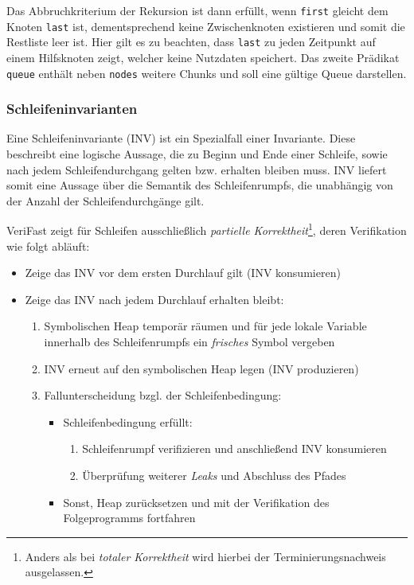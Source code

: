 Das Abbruchkriterium der Rekursion ist dann erfüllt, wenn \texttt{first} gleicht dem Knoten \texttt{last} ist, dementsprechend keine Zwischenknoten existieren und somit die Restliste leer ist. Hier gilt es zu beachten, dass \texttt{last} zu jeden Zeitpunkt auf einem Hilfsknoten zeigt, welcher keine Nutzdaten speichert. Das zweite Prädikat \texttt{queue} enthält neben \texttt{nodes} weitere Chunks und soll eine gültige Queue darstellen. %

\subsubsection{Schleifeninvarianten}

Eine Schleifeninvariante (INV) ist ein Spezialfall einer Invariante. Diese beschreibt eine logische Aussage, die zu Beginn und Ende einer Schleife, sowie nach jedem Schleifendurchgang gelten bzw. erhalten bleiben muss. INV liefert somit eine Aussage über die Semantik des Schleifenrumpfs, die unabhängig von der Anzahl der Schleifendurchgänge gilt.

VeriFast zeigt für Schleifen ausschließlich \emph{partielle Korrektheit}\footnote{Anders als bei \emph{totaler Korrektheit} wird hierbei der Terminierungsnachweis ausgelassen.}, deren Verifikation wie folgt abläuft: \cite{Jacobs2017}

\begin{itemize}
	\item Zeige das INV vor dem ersten Durchlauf gilt (INV konsumieren)
	\item Zeige das INV nach jedem Durchlauf erhalten bleibt:
	\begin{enumerate}
		\item Symbolischen Heap temporär räumen und für jede lokale Variable innerhalb des Schleifenrumpfs ein \emph{frisches} Symbol vergeben
		\item INV erneut auf den symbolischen Heap legen (INV produzieren)
		\item Fallunterscheidung bzgl. der Schleifenbedingung: %
		\begin{itemize}
			\setlength\itemsep{3pt}
			\item Schleifenbedingung erfüllt:
			\begin{enumerate}
				\item Schleifenrumpf verifizieren und anschließend INV konsumieren
				\item Überprüfung weiterer \emph{Leaks} und Abschluss des Pfades
			\end{enumerate}
			\item Sonst, Heap zurücksetzen und mit der Verifikation des Folgeprogramms fortfahren
		\end{itemize}
	\end{enumerate}
\end{itemize}


